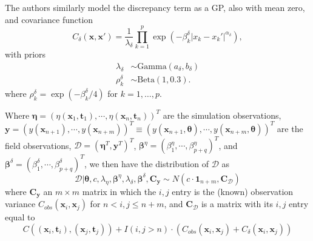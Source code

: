 \documentclass{article}
\begin{document}
The authors similarly model the discrepancy term as a GP, also with mean zero, and covariance function
\begin{equation}
C_\delta(\mathbf x,\mathbf x') = \frac 1{\lambda_\delta} \prod_{k=1}^p
\exp\left( -\beta_k^\delta |x_k-x_k'|^{\alpha_\delta} \right),
\end{equation}
with priors
\begin{equation}
\begin{aligned}
\lambda_\delta &\sim \mathrm{Gamma}(a_\delta,b_\delta)\\
\rho^\delta_k &\sim \mathrm{Beta}(1,0.3).
\end{aligned}
\end{equation}
where $\rho_k^\delta=\exp(-\beta_k^\delta/4)$ for $k=1,\ldots,p$.

Where $\boldsymbol \eta = (\eta(\mathbf x_1,\mathbf t_1),\cdots,\eta(\mathbf x_n,\mathbf t_n))^T$ are the simulation observations, $\mathbf y = (y(\mathbf x_{n+1}),\cdots,y(\mathbf x_{n+m}))^T\equiv (y(\mathbf x_{n+1},\boldsymbol\theta),\cdots,y(\mathbf x_{n+m},\boldsymbol\theta))^T$ are the field observations, $\mathcal D = (\boldsymbol \eta^T,\mathbf y^T)^T$, $\boldsymbol \beta^\eta = (\beta^\eta_1,\cdots,\beta_{p+q}^\eta)^T$, and $\boldsymbol \beta^\delta = (\beta^\delta_1,\cdots,\beta_{p+q}^\delta)^T$, we then have the distribution of $\mathcal D$ as 
\begin{equation}
\mathcal D | \boldsymbol \theta,c,\lambda_\eta, \boldsymbol \beta^\eta,\lambda_\delta,\boldsymbol \beta^\delta,\mathbf C_{\mathbf y} \sim N(c \cdot \mathbf 1_{n+m}, \mathbf C_{\mathcal D})
\end{equation}
where $\mathbf C_{\mathbf y}$ an $m\times m$ matrix in which the $i,j$ entry is the (known) observation variance $C_{obs}(\mathbf x_i,\mathbf x_j)$ for $n<i,j\leq n+m$, and $\mathbf C_{\mathcal D}$ is a matrix with its $i,j$ entry equal to
\begin{equation}\label{eq:C_D}
C((\mathbf x_i,\mathbf t_i),(\mathbf x_j,\mathbf t_j)) + I(i,j>n)\cdot(C_{obs}(\mathbf x_i,\mathbf x_j) + C_\delta(\mathbf x_i,\mathbf x_j))
\end{equation}
\end{document}
